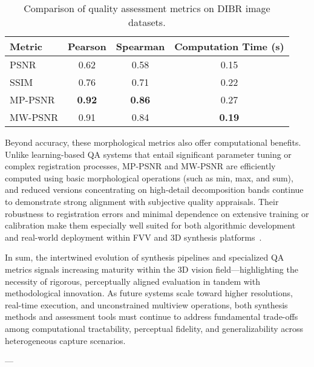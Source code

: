 \documentclass[11pt]{article}
\begin{document}
\begin{table}[ht]
    \centering
    \caption{Comparison of quality assessment metrics on DIBR image datasets.}
    \label{tab:metric_performance}
    \begin{tabular}{lccc}
        \hline
        \textbf{Metric} & \textbf{Pearson} & \textbf{Spearman} & \textbf{Computation Time (s)} \\
        \hline
        PSNR     & 0.62 & 0.58 & 0.15 \\
        SSIM     & 0.76 & 0.71 & 0.22 \\
        MP-PSNR  & \textbf{0.92} & \textbf{0.86} & 0.27 \\
        MW-PSNR  & 0.91 & 0.84 & \textbf{0.19} \\
        \hline
    \end{tabular}
\end{table}

Beyond accuracy, these morphological metrics also offer computational benefits. Unlike learning-based QA systems that entail significant parameter tuning or complex registration processes, MP-PSNR and MW-PSNR are efficiently computed using basic morphological operations (such as min, max, and sum), and reduced versions concentrating on high-detail decomposition bands continue to demonstrate strong alignment with subjective quality appraisals. Their robustness to registration errors and minimal dependence on extensive training or calibration make them especially well suited for both algorithmic development and real-world deployment within FVV and 3D synthesis platforms~\cite{QARef99}.

In sum, the intertwined evolution of synthesis pipelines and specialized QA metrics signals increasing maturity within the 3D vision field—highlighting the necessity of rigorous, perceptually aligned evaluation in tandem with methodological innovation. As future systems scale toward higher resolutions, real-time execution, and unconstrained multiview operations, both synthesis methods and assessment tools must continue to address fundamental trade-offs among computational tractability, perceptual fidelity, and generalizability across heterogeneous capture scenarios.

---

\end{document}
